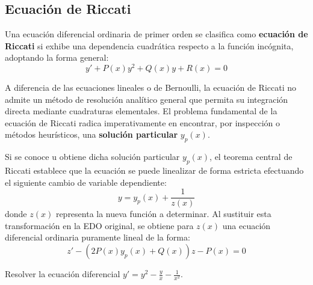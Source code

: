 \subsection{Ecuación de Riccati}

\begin{definicion}
Una ecuación diferencial ordinaria de primer orden se clasifica como \textbf{ecuación de Riccati} si exhibe una dependencia cuadrática respecto a la función incógnita, adoptando la forma general:
$$ y' + P(x)y^2 + Q(x)y + R(x) = 0 $$
\end{definicion}

A diferencia de las ecuaciones lineales o de Bernoulli, la ecuación de Riccati no admite un método de resolución analítico general que permita su integración directa mediante cuadraturas elementales. El problema fundamental de la ecuación de Riccati radica imperativamente en encontrar, por inspección o métodos heurísticos, una \textbf{solución particular} $y_p(x)$.

Si se conoce u obtiene dicha solución particular $y_p(x)$, el teorema central de Riccati establece que la ecuación se puede linealizar de forma estricta efectuando el siguiente cambio de variable dependiente:
$$ y = y_p(x) + \frac{1}{z(x)} $$
donde $z(x)$ representa la nueva función a determinar. Al sustituir esta transformación en la EDO original, se obtiene para $z(x)$ una ecuación diferencial ordinaria puramente lineal de la forma:
$$ z' - (2P(x)y_p(x) + Q(x))z - P(x) = 0 $$

\begin{ejercicio}
Resolver la ecuación diferencial $y' = y^2 - \frac{y}{x} - \frac{1}{x^2}$.
\end{ejercicio}

